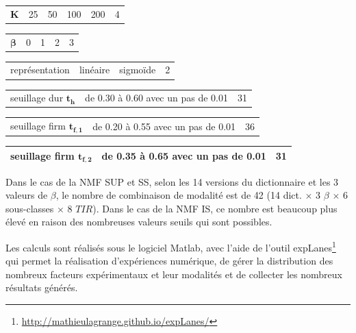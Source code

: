 \begin{table}[t]
\begin{tabularx}{17.5cm}{L{3cm}@{}C{3cm}@{}@{}C{3cm}@{}@{}C{3cm}@{}@{}C{3cm}@{}C{2cm}@{}}
    $\mathbf{K}$ & 25 & 50 & 100 & 200 & 4\\
\end{tabularx}

\begin{tabularx}{17.5cm}{L{3cm}@{}C{4cm}@{}@{}C{4cm}@{}@{}C{4cm}@{}C{2cm}@{}}
   $\mathbf{\beta}$ & 0 & 1 & 2 & 3\\
\end{tabularx}

\begin{tabularx}{17.5cm}{L{3cm}@{}C{6cm}@{}@{}C{6cm}@{}C{2cm}@{}}
   représentation & linéaire & sigmoïde & 2\\
\end{tabularx}

\begin{tabularx}{17.5cm}{L{3cm}@{}C{12cm}@{}C{2cm}@{}}
	seuillage dur $\mathbf{t_h}$ & de 0.30 à 0.60 avec un pas de 0.01 & 31\\
\end{tabularx}

\begin{tabularx}{17.5cm}{L{3cm}@{}C{12cm}@{}C{2cm}@{}}
   seuillage firm $\mathbf{t_{f,1}}$ & de 0.20 à 0.55 avec un pas de 0.01 & 36\\
\end{tabularx}

\begin{tabularx}{17.5cm}{L{3cm}@{}C{12cm}@{}C{2cm}@{}}
   seuillage firm $\mathbf{t_{f,2}}$ & de 0.35 à 0.65 avec un pas de 0.01 & 31\\
   \bottomrule
\end{tabularx}
\label{tab:experimental_factorsNMF_ambiance}
\end{table}

Dans le cas de la NMF SUP et SS, selon les 14 versions du dictionnaire et les 3 valeurs de $\beta$, le nombre de combinaison de modalité est de 42 (14 dict. $\times$ 3 $\beta$ $\times$ 6 sous-classes $\times$ 8 $TIR$).
Dans le cas de la NMF IS, ce nombre est beaucoup plus élevé en raison des nombreuses valeurs seuils qui sont possibles.

Les calculs sont réalisés sous le logiciel Matlab, avec l'aide de l'outil expLanes\footnote{\url{http://mathieulagrange.github.io/expLanes/}} qui permet la réalisation d'expériences numérique, de gérer la distribution des nombreux facteurs expérimentaux et leur modalités et de collecter les nombreux résultats générés.

